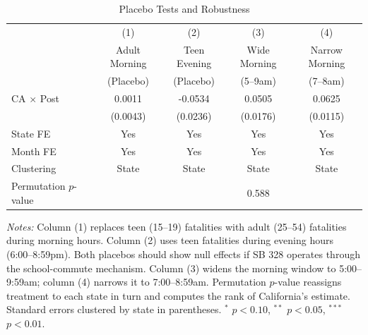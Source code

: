 \begin{table}[htbp]
\centering
\caption{Placebo Tests and Robustness}
\label{tab:robustness}
\begin{threeparttable}
\begin{tabular}{lcccc}
\toprule
 & (1) & (2) & (3) & (4) \\
 & Adult Morning & Teen Evening & Wide Morning & Narrow Morning \\
 & (Placebo) & (Placebo) & (5--9am) & (7--8am) \\
\midrule
CA $\times$ Post & 0.0011 & -0.0534\sym{**} & 0.0505\sym{***} & 0.0625\sym{***} \\
 & (0.0043) & (0.0236) & (0.0176) & (0.0115) \\
\midrule
State FE & Yes & Yes & Yes & Yes \\
Month FE & Yes & Yes & Yes & Yes \\
Clustering & State & State & State & State \\
Permutation $p$-value & & & 0.588 & \\
\bottomrule
\end{tabular}
\begin{tablenotes}[flushleft]
\small
\item \textit{Notes:} Column (1) replaces teen (15--19) fatalities with adult (25--54) fatalities during morning hours. Column (2) uses teen fatalities during evening hours (6:00--8:59pm). Both placebos should show null effects if SB 328 operates through the school-commute mechanism. Column (3) widens the morning window to 5:00--9:59am; column (4) narrows it to 7:00--8:59am. Permutation $p$-value reassigns treatment to each state in turn and computes the rank of California's estimate. Standard errors clustered by state in parentheses. $^{*}$ $p<0.10$, $^{**}$ $p<0.05$, $^{***}$ $p<0.01$.
\end{tablenotes}
\end{threeparttable}
\end{table}

